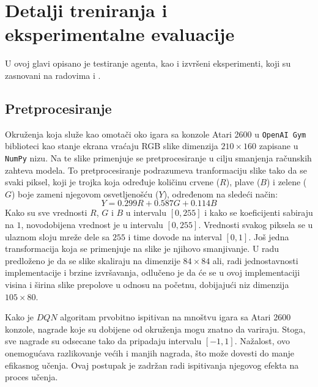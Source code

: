 \chapter{Detalji treniranja i eksperimentalne evaluacije}
\label{ch:treniranje_testiranje}

U ovoj glavi opisano je testiranje agenta, kao i izvršeni eksperimenti, koji su zasnovani na radovima \cite{dqn_mnih} i \cite{dqn_dm}.

\section{Pretprocesiranje}
\label{sec:pretprocesiranje}
Okruženja koja služe kao omotači oko igara sa konzole Atari 2600 u \texttt{OpenAI Gym} biblioteci kao stanje ekrana vraćaju RGB slike dimenzija $210 \times 160$ zapisane u \texttt{NumPy} nizu. Na te slike primenjuje se pretprocesiranje u cilju smanjenja računskih zahteva modela. To pretprocesiranje podrazumeva tranformaciju slike tako da se svaki piksel, koji je trojka koja određuje količinu crvene ($R$), plave ($B$) i zelene ($G$) boje zameni njegovom osvetljenošću ($Y$), određenom na sledeći način:
\begin{equation}
\label{eq:lum}
	Y = 0.299 R + 0.587 G + 0.114 B
\end{equation}
Kako su sve vrednosti $R$, $G$ i $B$ u intervalu $[0, 255]$ i kako se koeficijenti sabiraju na $1$, novodobijena vrednost je u intervalu $[0, 255]$. Vrednosti svakog piksela se u ulaznom sloju mreže dele sa $255$ i time dovode na interval $[0, 1]$. Još jedna transformacija koja se primenjuje na slike je njihovo smanjivanje. U radu \cite{dqn_dm} predloženo je da se slike skaliraju na dimenzije $84 \times 84$ ali, radi jednostavnosti implementacije i brzine izvršavanja, odlučeno je da će se u ovoj implementaciji visina i širina slike prepolove u odnosu na početnu, dobijajući niz dimenzija $105 \times 80$.
\par 
Kako je $DQN$ algoritam prvobitno ispitivan na mnoštvu igara sa Atari 2600 konzole, nagrade koje su dobijene od okruženja mogu znatno da variraju. Stoga, sve nagrade su odsecane tako da pripadaju intervalu $[-1, 1]$. Nažalost, ovo onemogućava razlikovanje većih i manjih nagrada, što može dovesti do manje efikasnog učenja. Ovaj postupak je zadržan radi ispitivanja njegovog efekta na proces učenja.

